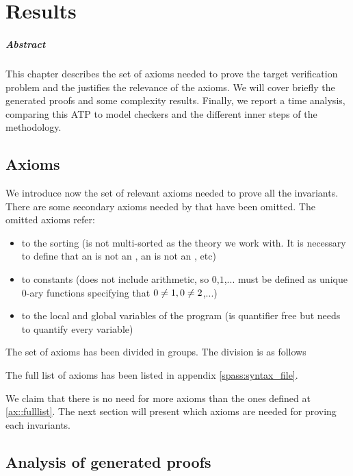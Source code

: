 \chapter{Results\label{chap:results}}

\paragraph{Abstract}

This chapter describes the set of axioms needed to prove the target verification problem and the justifies the relevance of the axioms.
%
We will cover briefly the generated proofs and some complexity results.
%
Finally, we report a time analysis, comparing this \gls{ATP} to model checkers and the different inner steps of the methodology.


\section{Axioms}

We introduce now the set of relevant axioms needed to prove all the invariants.
%
There are some secondary axioms needed by \spass that have been omitted. 
%
The omitted axioms refer: 
%
\begin{itemize}
	\item to the sorting (\spass is not multi-sorted as the theory we work with. It is necessary to define that an \addr is not an \elem, an \elem is not an \addr, etc)
	\item to constants (\spass does not include arithmetic, so $0$,$1$,... must be defined as unique 0-ary functions specifying that $0\not= 1,0\not= 2$,...)
	\item to the local and global variables of the program (\leap is quantifier free but \spass needs to quantify every variable)
\end{itemize}  
%
The set of axioms has been divided in groups. 
%
The division is as follows
		
\label{ax::fulllist}



The full list of axioms has been listed in appendix \ref{spass:syntax_file}. 

%

We claim that there is no need for more axioms than the ones defined at \ref{ax::fulllist}. 
%
The next section will present which axioms are needed for proving each invariants.

\section{Analysis of generated proofs}
\label{proof:Preserve}
\label{sec:axiomgraph}

